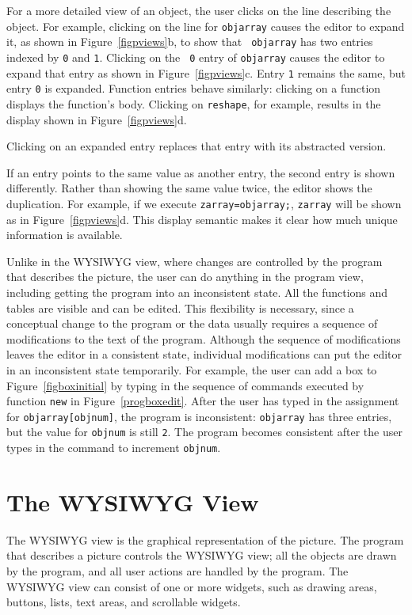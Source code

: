 For a more detailed view of an object, the user clicks on the line describing
the object. For example, clicking on the line for {\tt objarray} causes the
editor to expand it, as shown in Figure~\ref{figpviews}b, to show that {\tt
objarray} has two entries indexed by {\tt 0} and {\tt 1}. Clicking on the {\tt
0} entry of {\tt objarray} causes the editor to expand that entry as shown in
Figure~\ref{figpviews}c. Entry {\tt 1} remains the same, but entry {\tt 0} is
expanded. Function entries behave similarly: clicking on a function displays
the function's body. Clicking on {\tt reshape}, for example, results in the
display shown in Figure~\ref{figpviews}d.

Clicking on an expanded entry replaces that entry with its abstracted version.

If an entry points to the same value as another entry, the second entry is
shown differently. Rather than showing the same value twice, the editor shows
the duplication. For example, if we execute \verb+zarray=objarray;+,
\verb+zarray+ will be shown as in Figure~\ref{figpviews}d. This display
semantic makes it clear how much unique information is available.

Unlike in the WYSIWYG view, where changes are controlled by the program that
describes the picture, the user can do anything in the program view, including
getting the program into an inconsistent state. All the functions and tables
are visible and can be edited. This flexibility is necessary, since a
conceptual change to the program or the data usually requires a sequence of
modifications to the text of the program. Although the sequence of
modifications leaves the editor in a consistent state, individual modifications
can put the editor in an inconsistent state temporarily. For example, the user
can add a box to Figure~\ref{figboxinitial} by typing in the sequence of
commands executed by function {\tt new} in Figure~\ref{progboxedit}. After the
user has typed in the assignment for \verb+objarray[objnum]+, the program is
inconsistent: {\tt objarray} has three entries, but the value for {\tt objnum}
is still {\tt 2}. The program becomes consistent after the user types in the
command to increment {\tt objnum}.

\section{The WYSIWYG View}
The WYSIWYG view is the graphical representation of the picture. The program
that describes a picture controls the WYSIWYG view; all the objects are drawn
by the program, and all user actions are handled by the program. The WYSIWYG
view can consist of one or more widgets, such as drawing areas, buttons, lists,
text areas, and scrollable widgets.

